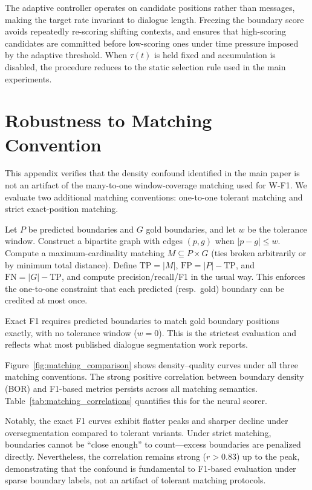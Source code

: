 The adaptive controller operates on candidate positions rather than messages,
making the target rate invariant to dialogue length. Freezing the boundary score
avoids repeatedly re-scoring shifting contexts, and ensures that high-scoring
candidates are committed before low-scoring ones under time pressure imposed by
the adaptive threshold. When $\tau(t)$ is held fixed and accumulation is
disabled, the procedure reduces to the static selection rule used in the main
experiments.

\FloatBarrier

\section{Robustness to Matching Convention}
\label{app:wf1:matching}

This appendix verifies that the density confound identified in the main paper is not an artifact of the many-to-one window-coverage matching used for W-F1. We evaluate two additional matching conventions: one-to-one tolerant matching and strict exact-position matching.

Let $P$ be predicted boundaries and $G$ gold boundaries, and let $w$ be the tolerance window.
Construct a bipartite graph with edges $(p,g)$ when $|p-g|\le w$.
Compute a maximum-cardinality matching $M \subseteq P \times G$ (ties broken arbitrarily or by minimum total distance).
Define $\mathrm{TP}=|M|$, $\mathrm{FP}=|P|-\mathrm{TP}$, and $\mathrm{FN}=|G|-\mathrm{TP}$, and compute precision/recall/F1 in the usual way.
This enforces the one-to-one constraint that each predicted (resp.\ gold) boundary can be credited at most once.

Exact F1 requires predicted boundaries to match gold boundary positions exactly, with no tolerance window ($w=0$). This is the strictest evaluation and reflects what most published dialogue segmentation work reports.

Figure~\ref{fig:matching_comparison} shows density--quality curves under all three matching conventions. The strong positive correlation between boundary density (BOR) and F1-based metrics persists across all matching semantics. Table~\ref{tab:matching_correlations} quantifies this for the neural scorer.

Notably, the exact F1 curves exhibit flatter peaks and sharper decline under oversegmentation compared to tolerant variants. Under strict matching, boundaries cannot be ``close enough'' to count---excess boundaries are penalized directly. Nevertheless, the correlation remains strong ($r > 0.83$) up to the peak, demonstrating that the confound is fundamental to F1-based evaluation under sparse boundary labels, not an artifact of tolerant matching protocols.

